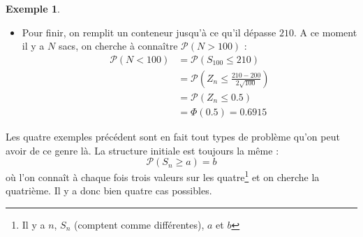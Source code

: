 \documentclass[a4paper,12pt]{report}
\theoremstyle{definition}
\renewcommand{\(}{\left(}
\renewcommand{\)}{\right)}
\renewcommand{\P}{\mathcal{P}}
\newtheorem{exmp}[thm]{Exemple}
\begin{document}
\begin{exmp}
\begin{itemize}[label=\textbullet]
                \item Pour finir, on remplit un conteneur jusqu'à ce qu'il dépasse $210$. A ce moment il y a $N$ sacs, on cherche à connaître $\P(N>100)$ :
                \begin{align*}
                    \P(N<100) &= \P(S_{100} \leq 210) \\
                    &= \P\left(Z_n \leq \frac{210-200}{2\sqrt{100}}\right) \\
                    &= \P(Z_n \leq 0.5) \\
                    &= \Phi(0.5) =0.6915
                \end{align*}
            \end{itemize}
        \end{exmp}
        
        Les quatre exemples précédent sont en fait tout types de problème qu'on peut avoir de ce genre là. La structure initiale est toujours la même :
        $$\P(S_n\geq a) = b$$
        où l'on connaît à chaque fois trois valeurs sur les quatre\footnote{Il y a $n$, $S_n$ (comptent comme différentes), $a$ et $b$} et on cherche la quatrième. Il y a donc bien quatre cas possibles.\\
        
\end{document}
